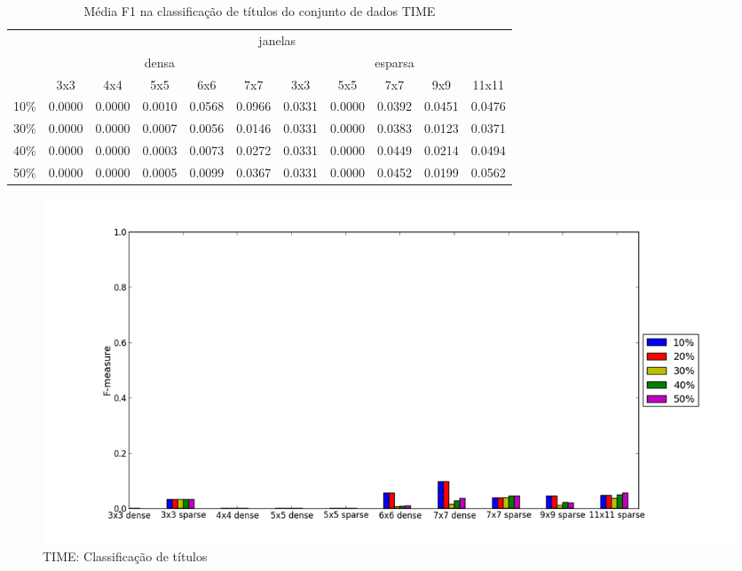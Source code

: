 \documentclass[a4paper,11pt]{article}
\begin{document}
  \begin{center}
    \begin{table}[p]
      \caption{Média F1 na classificação de títulos do conjunto de dados TIME}
      \begin{tabular}{ l | c c c c c || c c c c c | }
        \cline{2-11}
        & \multicolumn{10}{|c|}{janelas} \\
        \cline{2-11}
        & \multicolumn{5}{c||}{densa} & \multicolumn{5}{c|}{esparsa} \\
        \cline{2-11}
        & 3x3 & 4x4 & 5x5 & 6x6 & 7x7 & 3x3 & 5x5 & 7x7 & 9x9 & 11x11 \\
        \hline
        \multicolumn{1}{|l|}{10\%}& 0.0000& 0.0000& 0.0010& 0.0568& 0.0966& 0.0331& 0.0000& 0.0392& 0.0451& 0.0476\\
        \multicolumn{1}{|l|}{30\%}& 0.0000& 0.0000& 0.0007& 0.0056& 0.0146& 0.0331& 0.0000& 0.0383& 0.0123& 0.0371\\
        \multicolumn{1}{|l|}{40\%}& 0.0000& 0.0000& 0.0003& 0.0073& 0.0272& 0.0331& 0.0000& 0.0449& 0.0214& 0.0494\\
        \multicolumn{1}{|l|}{50\%}& 0.0000& 0.0000& 0.0005& 0.0099& 0.0367& 0.0331& 0.0000& 0.0452& 0.0199& 0.0562\\
        \hline  
      \end{tabular}
      \label{tab:time_f1_heading}
    \end{table}
  \end{center}

  \begin{figure}[p]
    \centerline{\includegraphics[width=1.2\textwidth]{assets/experiment_charts/time_TextRegion_heading_f1.png}}
    \caption{TIME: Classificação de títulos}
    \label{fig:time_TextRegion_heading_f1}
  \end{figure}
\end{document}
